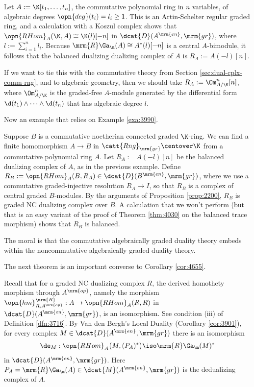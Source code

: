 \begin{exa} \label{exa:3990}
Let $A := \K[t_1, \ldots, t_n]$, the commutative polynomial ring in $n$ 
variables, of algebraic degrees $\opn{deg}(t_i) = l_i \geq 1$. This is an 
Artin-Schelter regular graded ring, and a calculation with a Koszul complex 
shows that $\opn{RHom}_A(\K, A) \cong \K(l)[-n]$
in $\dcat{D}(A^{\mrm{en}}, \mrm{gr})$, where 
$l := \sum_{i = 1}^n l_i$. 
Because 
$\mrm{R} \Ga_{\m}(A) \cong A^*(l)[-n]$
is a central $A$-bimodule, it follows that the balanced dualizing dualizing 
complex of $A$ is $R_A := A(-l)[n]$. 

If we want to tie this with the commutative theory from Section
\ref{sec:dual-cplx-comm-rng}, and to algebraic geometry,
then we should take 
$R_A := \Om^n_{A / \K}[n]$,
where $\Om^n_{A / \K}$ is the graded-free $A$-module generated by the 
differential form 
$\d(t_1) \wedge \cdots \wedge \d(t_n)$ 
that has algebraic degree $l$. 
\end{exa}

Now an example that relies on Example \ref{exa:3990}. 

\begin{exa} \label{exa:3991}
Suppose $B$ is a commutative noetherian connected graded $\K$-ring. 
We can find a finite homomorphism $A \to B$ in 
$\catt{Rng}_{\mrm{gr}} \centover \K$ from a commutative polynomial ring $A$. 
Let $R_A := A(-l)[n]$ be the balanced dualizing complex of $A$, as in the 
previous example. Define 
$R_B := \opn{RHom}_{A}(B, R_A) \in \dcat{D}(B^{\mrm{en}}, \mrm{gr})$,
where we use a commutative graded-injective resolution $R_A \to I$, so that 
$R_B$ is a complex of central graded $B$-modules. 
By the arguments of Proposition \ref{prop:2200}, $R_B$ is graded NC 
dualizing complex over $B$. A calculation that we won't perform (but that is an 
easy variant of the proof of Theorem \ref{thm:4030} on the balanced 
trace morphism) shows that $R_B$ is balanced. 

The moral is that the commutative algebraically graded duality theory embeds 
within the noncommutative algebraically graded duality theory.  
\end{exa}

The next theorem is an important converse to Corollary \ref{cor:4655}.

Recall that for a graded NC dualizing complex $R$, the derived homothety 
morphism through $A^{\mrm{op}}$, namely the morphism 
$\opn{hm}^{\mrm{R}}_{R, A^{\mrm{op}}} : A \to \opn{RHom}_{A}(R, R)$ 
in \lb $\dcat{D}(A^{\mrm{en}}, \mrm{gr})$, is an isomorphism. See condition 
(iii) of Definition  \ref{dfn:3716}. 
By Van den Bergh's Local Duality (Corollary \ref{cor:3901}), for every complex 
$M \in \dcat{D}(A^{\mrm{en}},  \mrm{gr})$ there is an isomorphism 
\begin{equation} \label{eqn:4580}
\de_M : \opn{RHom}_A \bigl( M, (P_A)^* \bigr) \iso \mrm{R} \Ga_{\m}(M)^* 
\end{equation}
in $\dcat{D}(A^{\mrm{en}}, \mrm{gr})$.
Here 
$P_A = \mrm{R} \Ga_{\m}(A) \in \dcat{M}(A^{\mrm{en}}, \mrm{gr})$
is the dedualizing complex of $A$. 

